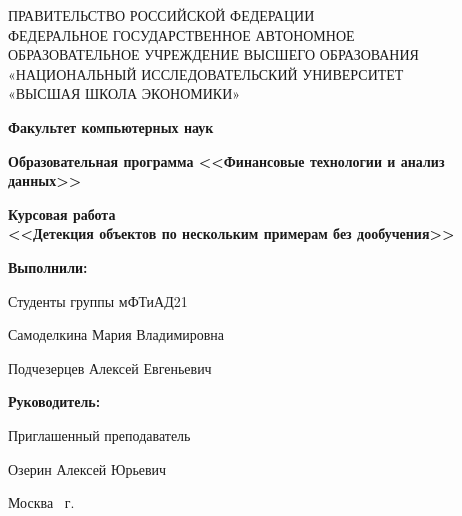 \begin{titlepage}
    \begin{center}
        ПРАВИТЕЛЬСТВО РОССИЙСКОЙ ФЕДЕРАЦИИ \\
        ФЕДЕРАЛЬНОЕ ГОСУДАРСТВЕННОЕ АВТОНОМНОЕ \\
        ОБРАЗОВАТЕЛЬНОЕ УЧРЕЖДЕНИЕ ВЫСШЕГО ОБРАЗОВАНИЯ\\
        «НАЦИОНАЛЬНЫЙ ИССЛЕДОВАТЕЛЬСКИЙ УНИВЕРСИТЕТ\\
        «ВЫСШАЯ ШКОЛА ЭКОНОМИКИ»
    \end{center}

    \begin{center}
        \textbf{Факультет компьютерных наук}

        \textbf{Образовательная программа <<Финансовые технологии и анализ данных>>}


    \end{center}
    \vspace{1ex}

    \begin{center}
        \textbf{Курсовая работа \\
            <<Детекция объектов по нескольким примерам без дообучения>>
        }
    \end{center}

    \vspace{2ex}
    \vfill

    \vspace{2ex}

    \begin{flushright}
        \textbf{Выполнили:}

        \vspace{2ex}

        Студенты группы мФТиАД21

        \vspace{2ex}

        Самоделкина Мария Владимировна

        Подчезерцев Алексей Евгеньевич

        \vspace{2ex}
        \textbf{Руководитель:}

        Приглашенный преподаватель

        Озерин Алексей Юрьевич

    \end{flushright}

    \vspace{5ex}
    \begin{center}
        Москва \the\year \, г.
    \end{center}

\end{titlepage}
\addtocounter{page}{1}